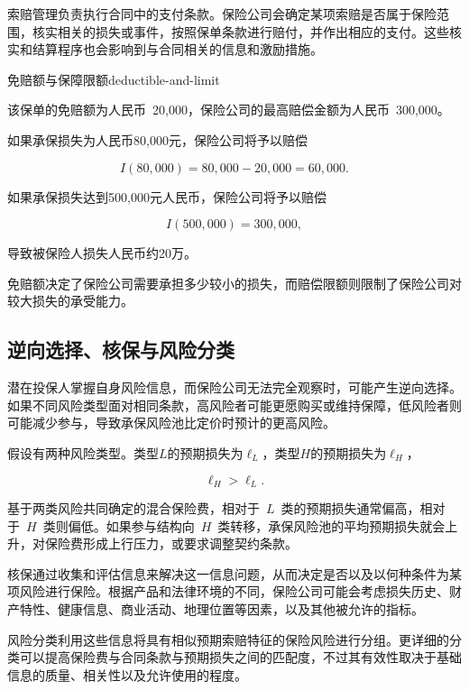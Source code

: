 索赔管理负责执行合同中的支付条款。保险公司会确定某项索赔是否属于保险范围，核实相关的损失或事件，按照保单条款进行赔付，并作出相应的支付。这些核实和结算程序也会影响到与合同相关的信息和激励措施。

\begin{example}{免赔额与保障限额}{deductible-and-limit}

该保单的免赔额为人民币~20,000，保险公司的最高赔偿金额为人民币~300,000。

如果承保损失为人民币80,000元，保险公司将予以赔偿

$$
I(80{,}000)=80{,}000-20{,}000=60{,}000.
$$

如果承保损失达到500,000元人民币，保险公司将予以赔偿

$$
I(500{,}000)=300{,}000,
$$

导致被保险人损失人民币约20万。

免赔额决定了保险公司需要承担多少较小的损失，而赔偿限额则限制了保险公司对较大损失的承受能力。

\end{example}


\subsection{逆向选择、核保与风险分类}

潜在投保人掌握自身风险信息，而保险公司无法完全观察时，可能产生逆向选择。如果不同风险类型面对相同条款，高风险者可能更愿购买或维持保障，低风险者则可能减少参与，导致承保风险池比定价时预计的更高风险。

假设有两种风险类型。类型$L$的预期损失为$\ell_L$，类型$H$的预期损失为$\ell_H$，

\begin{equation}
\ell_H>\ell_L.
\label{eq}
\end{equation}

基于两类风险共同确定的混合保险费，相对于~$L$~类的预期损失通常偏高，相对于~$H$~类则偏低。如果参与结构向~$H$~类转移，承保风险池的平均预期损失就会上升，对保险费形成上行压力，或要求调整契约条款。

核保通过收集和评估信息来解决这一信息问题，从而决定是否以及以何种条件为某项风险进行保险。根据产品和法律环境的不同，保险公司可能会考虑损失历史、财产特性、健康信息、商业活动、地理位置等因素，以及其他被允许的指标。

风险分类利用这些信息将具有相似预期索赔特征的保险风险进行分组。更详细的分类可以提高保险费与合同条款与预期损失之间的匹配度，不过其有效性取决于基础信息的质量、相关性以及允许使用的程度。

